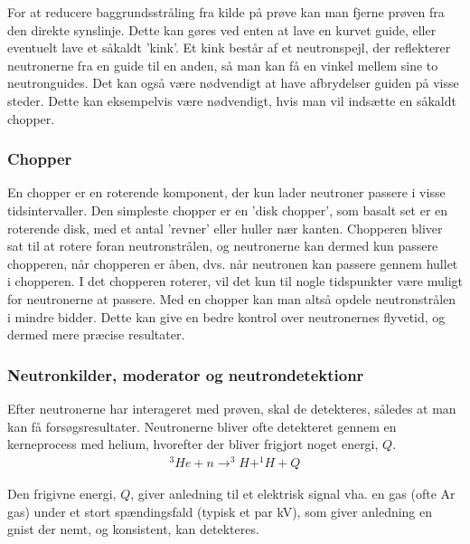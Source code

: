 \documentclass[12pt,oneside,a4paper]{article}
\begin{document}
{{{{{For at reducere baggrundsstråling fra kilde på prøve kan man fjerne prøven fra den direkte synslinje. Dette kan gøres ved enten at lave en kurvet guide, eller eventuelt lave et såkaldt 'kink'. Et kink består af et neutronspejl, der reflekterer neutronerne fra en guide til en anden, så man kan få en vinkel mellem sine to neutronguides. 
Det kan også være nødvendigt at have afbrydelser guiden på visse steder. Dette kan eksempelvis være nødvendigt, hvis man vil indsætte en såkaldt chopper.

\subsubsection{Chopper}
En chopper er en roterende komponent, der kun lader neutroner passere i visse tidsintervaller. Den simpleste chopper er en 'disk chopper', som basalt set er en roterende disk, med et antal 'revner' eller huller nær kanten. Chopperen bliver sat til at rotere foran neutronstrålen, og neutronerne kan dermed kun passere chopperen, når chopperen er åben, dvs. når neutronen kan passere gennem hullet i chopperen. I det chopperen roterer, vil det kun til nogle tidspunkter være muligt for neutronerne at passere. Med en chopper kan man altså opdele neutronstrålen i mindre bidder. Dette kan give en bedre kontrol over neutronernes flyvetid, og dermed mere præcise resultater. \cite{ess_folder}

\subsubsection{Neutronkilder, moderator og neutrondetektionr}
Efter neutronerne har interageret med prøven, skal de detekteres, således at man kan få forsøgsresultater. Neutronerne 
bliver ofte detekteret gennem en kerneprocess med helium, hvorefter der bliver frigjort noget energi, $Q$. \cite{lefmann_arleth_kirkensgaard_lebech_thomsen}
\begin{align}
^3He + n \to  ^3H + ^1H + Q
\end{align}

Den frigivne energi, $Q$, giver anledning til et elektrisk signal vha. en gas (ofte Ar gas) under et stort spændingsfald (typisk et par kV), som giver anledning en gnist der nemt, og konsistent, kan detekteres.

}}}}}
\end{document}
